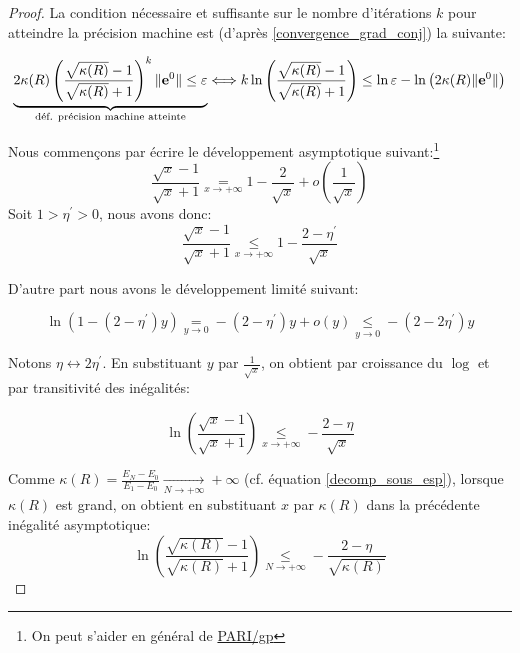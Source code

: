 \documentclass[svgnames,dvipsnames,a4paper,10pt,french]{report}
\begin{document}
\begin{proof}
La condition nécessaire et suffisante sur le nombre d'itérations $k$ pour atteindre la précision machine est (d'après \ref{convergence_grad_conj}) la suivante:


\begin{equation}
\label{condition_convergence_precision_machine}
    \underbrace{2 \kappa (R) \left( \frac{\sqrt{\kappa (R)} - 1}{\sqrt{\kappa (R)} + 1} \right)^k \| \mathbf{e}^0\| \le \varepsilon}_{\text{déf. précision machine atteinte}} \Longleftrightarrow  k \ln \left( \frac{\sqrt{\kappa (R)} - 1}{\sqrt{\kappa (R)} + 1} \right)   \le \ln \varepsilon -  \ln \left(2 \kappa (R) \| \mathbf{e}^0\|\right)
\end{equation}



Nous commençons par écrire le développement asymptotique suivant:\footnote{On peut s'aider en général de \href{https://pari.math.u-bordeaux.fr/}{PARI/gp}
}
\begin{equation*}
    \frac{\sqrt{x}-1}{\sqrt{x}+1}\underset{x\rightarrow+\infty}{=} 1 - \frac{2}{\sqrt{x}}+  o\left(\frac{1}{\sqrt{x}}\right)
\end{equation*}
Soit  $1>\eta^\prime >0$, nous avons donc:
\begin{equation*}
    \frac{\sqrt{x}-1}{\sqrt{x}+1}\underset{x \rightarrow+\infty}{\le} 1 - \frac{2-\eta^\prime}{\sqrt{x}}
\end{equation*}


D'autre part nous avons le développement limité suivant:

\begin{equation*}
    \ln (1-(2-\eta^\prime)y) \underset{y\rightarrow 0}{=}-(2-\eta^\prime)y+o(y) \underset{y\rightarrow 0}{\le} -(2-2\eta^\prime)y
\end{equation*}

Notons $\eta \longleftrightarrow 2 \eta^\prime$.
En substituant $y$ par $\frac{1}{\sqrt{x}}$, on obtient  par croissance du $\log$ et par transitivité des inégalités:

\begin{equation*}
    \ln \left(\frac{\sqrt{x}-1}{\sqrt{x}+1} \right) \underset{x\rightarrow+\infty}{\le} -\frac{2-\eta}{\sqrt{x}}
\end{equation*}


Comme $\kappa(R)= \frac{E_N-E_0}{E_1-E_0} \xrightarrow[N \rightarrow + \infty]{} +\infty$ (cf. équation \ref{decomp_sous_esp}), lorsque $\kappa(R)$ est grand, on obtient en substituant $x$ par $\kappa(R)$ dans la précédente inégalité asymptotique:
\begin{equation*}
   \boxed{\ln \left( \frac{\sqrt{\kappa (R)} - 1}{\sqrt{\kappa (R)} + 1}\right) \underset{N \rightarrow+\infty}{\le} - \frac{2-\eta}{\sqrt{\kappa (R)}}}
\end{equation*}



\end{proof}
\end{document}
